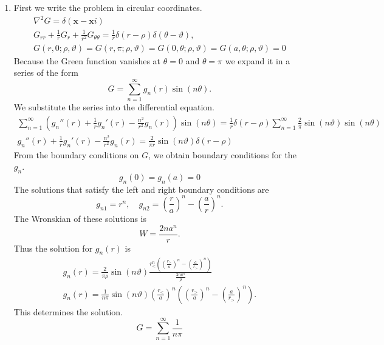 {\begin{Solution}
\begin{enumerate}
\begin{multline*}
      \sinh \left( \lambda_{m n} \pi z_< \right)
      \sinh \left( \lambda_{m n} \pi (W-z_>) \right)
    \end{multline*}
  \item
    First we write the problem in circular coordinates.
    \begin{gather*}
      \nabla^2 G = \delta(\mathbf{x} - \mathbf{x}i) \\
      G_{r r} + \frac{1}{r} G_r + \frac{1}{r^2} G_{\theta \theta}
      = \frac{1}{r} \delta(r - \rho) \delta(\theta - \vartheta), \\
      G(r,0; \rho, \vartheta) = G(r,\pi; \rho, \vartheta) = 
      G(0,\theta; \rho, \vartheta) = G(a,\theta; \rho, \vartheta) = 0
    \end{gather*}
    Because the Green function vanishes at $\theta = 0$ and
    $\theta = \pi$ we expand it in a series of the form
    \[
    G = \sum_{n = 1}^\infty g_n(r) \sin (n \theta).
    \]
    We substitute the series into the differential equation.
    \begin{gather*}
      \sum_{n = 1}^\infty \left( g_n''(r) + \frac{1}{r} g_n'(r) 
        - \frac{n^2}{r^2} g_n(r) \right) \sin (n \theta)
      = \frac{1}{r} \delta(r - \rho) 
      \sum_{n = 1}^\infty \frac{2}{\pi} \sin(n \vartheta) \sin(n \theta) \\
      g_n''(r) + \frac{1}{r} g_n'(r) - \frac{n^2}{r^2} g_n(r) 
      = \frac{2}{\pi r} \sin(n \vartheta) \delta(r - \rho) 
    \end{gather*}
    From the boundary conditions on $G$, we obtain boundary conditions 
    for the $g_n$.
    \[
    g_n(0) = g_n(a) = 0
    \]
    The solutions that satisfy the left and right boundary conditions are
    \[
    g_{n1} = r^n, \quad
    g_{n2} = \left( \frac{r}{a} \right)^n - \left( \frac{a}{r} \right)^n.
    \]
    The Wronskian of these solutions is
    \[
    W = \frac{2 n a^n}{r}.
    \]
    Thus the solution for $g_n(r)$ is
    \begin{gather*}
      g_n(r) = \frac{2}{\pi \rho} \sin(n \vartheta) 
      \frac{ r_<^n \left( \left( \frac{r_>}{a} \right)^n 
          - \left( \frac{a}{r_>} \right)^n \right) }
      { \frac{2 n a^n}{\rho} } \\
      g_n(r) = \frac{1}{n \pi} \sin(n \vartheta) 
      \left( \frac{r_<}{a} \right)^n \left( \left( \frac{r_>}{a} \right)^n 
        - \left( \frac{a}{r_>} \right)^n \right).
    \end{gather*}
    This determines the solution.
    \[
    G = \sum_{n = 1}^\infty \frac{1}{n \pi} 
\]
\end{enumerate}
\end{Solution}}
